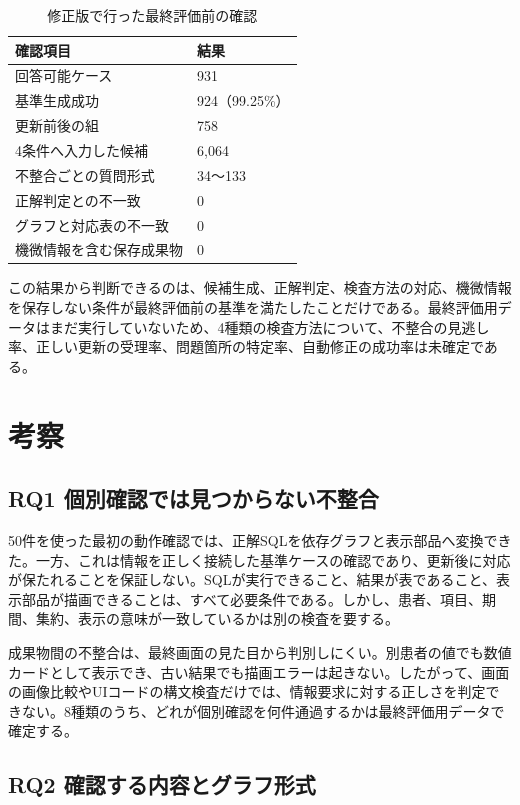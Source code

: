\documentclass[a4paper]{jsarticle}
\begin{document}
\begin{table}[t]
  \centering
  \caption{修正版で行った最終評価前の確認}
  \label{tab:validation-v11}
  \begin{tabular}{L{0.63\columnwidth}C{0.27\columnwidth}}
    \toprule
    確認項目 & 結果 \\
    \midrule
    回答可能ケース & 931 \\
    基準生成成功 & 924（99.25\%） \\
    更新前後の組 & 758 \\
    4条件へ入力した候補 & 6,064 \\
    不整合ごとの質問形式 & 34～133 \\
    正解判定との不一致 & 0 \\
    グラフと対応表の不一致 & 0 \\
    機微情報を含む保存成果物 & 0 \\
    \bottomrule
  \end{tabular}
\end{table}

この結果から判断できるのは、候補生成、正解判定、検査方法の対応、機微情報を保存しない条件が最終評価前の基準を満たしたことだけである。最終評価用データはまだ実行していないため、4種類の検査方法について、不整合の見逃し率、正しい更新の受理率、問題箇所の特定率、自動修正の成功率は未確定である。

\section{考察}

\subsection{RQ1 個別確認では見つからない不整合}

50件を使った最初の動作確認では、正解SQLを依存グラフと表示部品へ変換できた。一方、これは情報を正しく接続した基準ケースの確認であり、更新後に対応が保たれることを保証しない。SQLが実行できること、結果が表であること、表示部品が描画できることは、すべて必要条件である。しかし、患者、項目、期間、集約、表示の意味が一致しているかは別の検査を要する。

成果物間の不整合は、最終画面の見た目から判別しにくい。別患者の値でも数値カードとして表示でき、古い結果でも描画エラーは起きない。したがって、画面の画像比較やUIコードの構文検査だけでは、情報要求に対する正しさを判定できない。8種類のうち、どれが個別確認を何件通過するかは最終評価用データで確定する。

\subsection{RQ2 確認する内容とグラフ形式}
\end{document}
